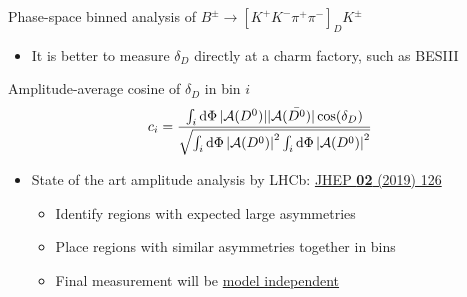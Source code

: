 \documentclass{beamer}
\begin{document}
\begin{frame}{Phase-space binned analysis of $B^\pm\to[K^+K^-\pi^+\pi^-]_DK^\pm$}
  \begin{itemize}
    \setlength\itemsep{0.5em}
    \item{It is better to measure $\delta_D$ directly at a charm factory, such as BESIII}
  \end{itemize}
  \vspace{0.1cm}
  \centering
  \begin{minipage}{0.7\textwidth}
    \begin{block}{\centering Amplitude-average cosine of $\delta_D$ in bin $i$}
      \begin{equation*}
        c_i = \frac{\int_i\dd{\Phi}|\mathcal{A}(D^0)||\mathcal{A}(\bar{D^0})|\cos(\delta_D)}{\sqrt{\int_i\dd{\Phi}\abs{\mathcal{A}(D^0)}^2\int_i\dd{\Phi}\abs{\mathcal{A}(D^0)}^2}}
      \end{equation*}
    \end{block}
  \end{minipage}
  \vspace{0.5cm}
  \begin{itemize}
    \setlength\itemsep{1.0em}
    \item{State of the art amplitude analysis by LHCb: \href{https://link.springer.com/article/10.1007/jhep02(2019)126}{JHEP \textbf{02} (2019) 126}}
    \begin{itemize}
      \setlength\itemsep{0.5em}
      \item{Identify regions with expected large asymmetries}
      \item{Place regions with similar asymmetries together in bins}
      \item{Final measurement will be \underline{model independent}}
    \end{itemize}
  \end{itemize}
\end{frame}
\end{document}
